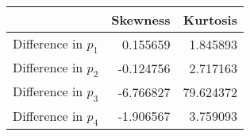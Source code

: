 \begin{tabular}{lrr}
\toprule
{} &  Skewness &   Kurtosis \\
\midrule
Difference in $p_1$ &  0.155659 &   1.845893 \\
Difference in $p_2$ & -0.124756 &   2.717163 \\
Difference in $p_3$ & -6.766827 &  79.624372 \\
Difference in $p_4$ & -1.906567 &   3.759093 \\
\bottomrule
\end{tabular}
